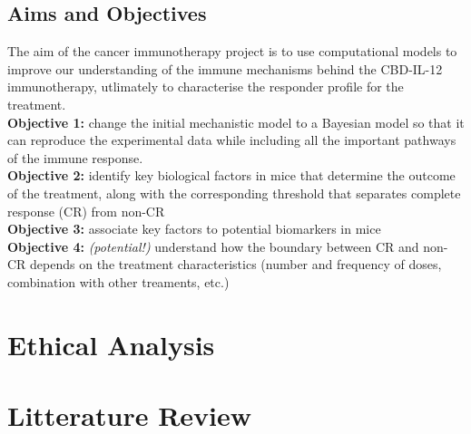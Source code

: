 \documentclass[11pt]{article}
\begin{document}
\subsection{Aims and Objectives}
\noindent The aim of the cancer immunotherapy project is to use computational models to improve our understanding of the immune mechanisms behind the CBD-IL-12 immunotherapy, utlimately to characterise the responder profile for the treatment.\\[8pt]
\textbf{Objective 1:} change the initial mechanistic model to a Bayesian model so that it can reproduce the experimental data while including all the important pathways of the immune response.\\ 
\textbf{Objective 2:} identify key biological factors in mice that determine the outcome of the treatment, along with the corresponding threshold that separates complete response (CR) from non-CR \\ 
\textbf{Objective 3:} associate key factors to potential biomarkers in mice\\ 
\textbf{Objective 4:} \textit{(potential!)}  understand how the boundary between CR and non-CR depends on the treatment characteristics (number and frequency of doses, combination with other treaments, etc.)

\section{Ethical Analysis}
\lipsum[1-1]

\pagebreak

\section{Litterature Review}\label{sec:littrev}

\end{document}
